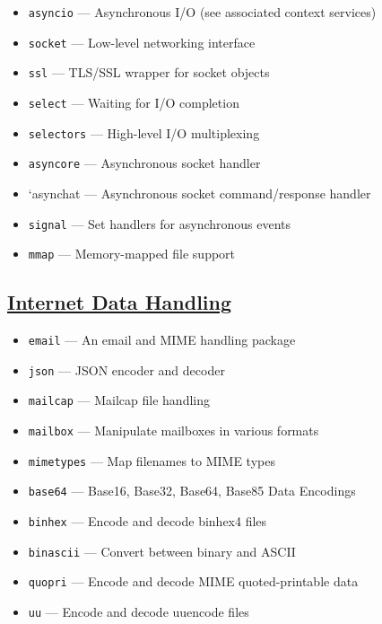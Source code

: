 \documentclass[]{book}
\providecommand{\tightlist}{%
  \setlength{\itemsep}{0pt}\setlength{\parskip}{0pt}}
\theoremstyle{definition}
\theoremstyle{definition}
\theoremstyle{definition}
\theoremstyle{remark}
\begin{document}
\begin{itemize}
\tightlist
\item
  \texttt{asyncio} --- Asynchronous I/O (see associated context
  services)
\item
  \texttt{socket} --- Low-level networking interface
\item
  \texttt{ssl} --- TLS/SSL wrapper for socket objects
\item
  \texttt{select} --- Waiting for I/O completion
\item
  \texttt{selectors} --- High-level I/O multiplexing
\item
  \texttt{asyncore} --- Asynchronous socket handler
\item
  `asynchat --- Asynchronous socket command/response handler
\item
  \texttt{signal} --- Set handlers for asynchronous events
\item
  \texttt{mmap} --- Memory-mapped file support
\end{itemize}

\subsection{\texorpdfstring{\href{https://docs.python.org/3.7/library/netdata.html}{Internet
Data Handling}}{Internet Data Handling}}\label{internet-data-handling}

\begin{itemize}
\tightlist
\item
  \texttt{email} --- An email and MIME handling package
\item
  \texttt{json} --- JSON encoder and decoder
\item
  \texttt{mailcap} --- Mailcap file handling
\item
  \texttt{mailbox} --- Manipulate mailboxes in various formats
\item
  \texttt{mimetypes} --- Map filenames to MIME types
\item
  \texttt{base64} --- Base16, Base32, Base64, Base85 Data Encodings
\item
  \texttt{binhex} --- Encode and decode binhex4 files
\item
  \texttt{binascii} --- Convert between binary and ASCII
\item
  \texttt{quopri} --- Encode and decode MIME quoted-printable data
\item
  \texttt{uu} --- Encode and decode uuencode files
\end{itemize}
\end{document}
